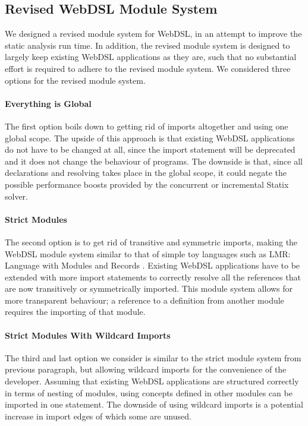     \subsection{\label{subsec:revised-module-system}Revised WebDSL Module System}

      We designed a revised module system for WebDSL, in an attempt to improve the static analysis run time. In addition, the revised module system is designed to largely keep existing WebDSL applications as they are, such that no substantial effort is required to adhere to the revised module system. We considered three options for the revised module system.
      
      \paragraph{Everything is Global} The first option boils down to getting rid of imports altogether and using one global scope. The upside of this approach is that existing WebDSL applications do not have to be changed at all, since the import statement will be deprecated and it does not change the behaviour of programs. The downside is that, since all declarations and resolving takes place in the global scope, it could negate the possible performance boosts provided by the concurrent \autocite{AntwerpenV21} or incremental \autocite{ZwaanAV22} Statix solver.

      \paragraph{Strict Modules} The second option is to get rid of transitive and symmetric imports, making the WebDSL module system similar to that of simple toy languages such as LMR: Language with Modules and Records \autocite{Neron2015}. Existing WebDSL applications have to be extended with more import statements to correctly resolve all the references that are now transitively or symmetrically imported. This module system allows for more transparent behaviour; a reference to a definition from another module requires the importing of that module.

      \paragraph{Strict Modules With Wildcard Imports} The third and last option we consider is similar to the strict module system from previous paragraph, but allowing wildcard imports for the convenience of the developer. Assuming that existing WebDSL applications are structured correctly in terms of nesting of modules, using concepts defined in other modules can be imported in one statement. The downside of using wildcard imports is a potential increase in import edges of which some are unused.

